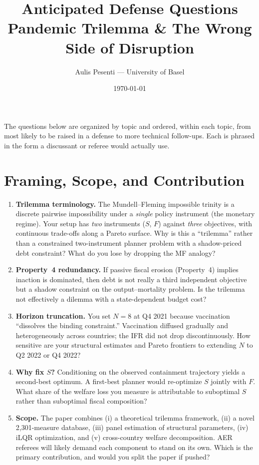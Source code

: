 \documentclass[11pt,a4paper]{article}
\title{Anticipated Defense Questions \\
\large Pandemic Trilemma \& The Wrong Side of Disruption}
\author{Aulis Pesenti --- University of Basel}
\date{\today}
\begin{document}
\maketitle

\noindent The questions below are organized by topic and ordered, within each topic, from most likely to be raised in a defense to more technical follow-ups. Each is phrased in the form a discussant or referee would actually use.

\section{Framing, Scope, and Contribution}

\begin{enumerate}
\item \textbf{Trilemma terminology.} The Mundell--Fleming impossible trinity is a discrete pairwise impossibility under a \emph{single} policy instrument (the monetary regime). Your setup has \emph{two} instruments ($S$, $F$) against \emph{three} objectives, with continuous trade-offs along a Pareto surface. Why is this a ``trilemma'' rather than a constrained two-instrument planner problem with a shadow-priced debt constraint? What do you lose by dropping the MF analogy?

\item \textbf{Property~4 redundancy.} If passive fiscal erosion (Property~4) implies inaction is dominated, then debt is not really a third independent objective but a shadow constraint on the output--mortality problem. Is the trilemma not effectively a dilemma with a state-dependent budget cost?

\item \textbf{Horizon truncation.} You set $N=8$ at Q4 2021 because vaccination ``dissolves the binding constraint.'' Vaccination diffused gradually and heterogeneously across countries; the IFR did not drop discontinuously. How sensitive are your structural estimates and Pareto frontiers to extending $N$ to Q2 2022 or Q4 2022?

\item \textbf{Why fix $S$?} Conditioning on the observed containment trajectory yields a second-best optimum. A first-best planner would re-optimize $S$ jointly with $F$. What share of the welfare loss you measure is attributable to suboptimal $S$ rather than suboptimal fiscal composition?

\item \textbf{Scope.} The paper combines (i) a theoretical trilemma framework, (ii) a novel 2{,}301-measure database, (iii) panel estimation of structural parameters, (iv) iLQR optimization, and (v) cross-country welfare decomposition. AER referees will likely demand each component to stand on its own. Which is the primary contribution, and would you split the paper if pushed?
\end{enumerate}
\end{document}
